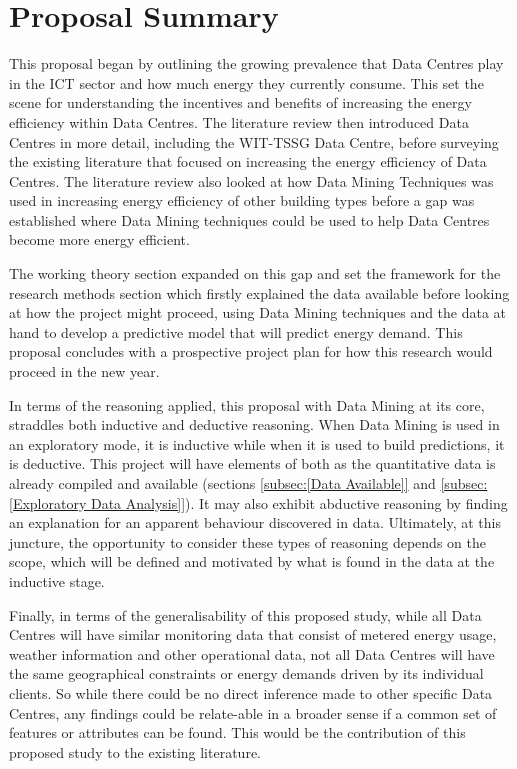 \documentclass[12pt]{scrartcl}
\begin{document}
\section{Proposal Summary}
\label{sec:[Proposal Summary]}
This proposal began by outlining the growing prevalence that Data Centres play in the ICT sector and how much energy they currently consume. This set the scene for understanding the incentives and benefits of increasing the energy efficiency within Data Centres. The literature review then introduced Data Centres in more detail, including the WIT-TSSG Data Centre, before surveying the existing literature that focused on increasing the energy efficiency of Data Centres.  The literature review also looked at how Data Mining Techniques was used in increasing energy efficiency of other building types before a gap was established where Data Mining techniques could be used to help Data Centres become more energy efficient. 

The working theory section expanded on this gap and set the framework for the research methods section which firstly explained the data available before looking at how the project might proceed, using Data Mining techniques and the data at hand to develop a predictive model that will predict energy demand. This proposal concludes with a prospective project plan for how this research would proceed in the new year.  

In terms of the reasoning applied, this proposal with Data Mining at its core, straddles both inductive and deductive reasoning. When Data Mining is used in an exploratory mode, it is inductive while when it is used to build predictions, it is deductive. This project will have elements of both as the quantitative data is already compiled and available (sections \ref{subsec:[Data Available]} and \ref{subsec:[Exploratory Data Analysis]}). It may also exhibit abductive reasoning by finding an explanation for an apparent behaviour discovered in data. Ultimately, at this juncture, the opportunity to consider these types of reasoning depends on the scope, which will be defined and motivated by what is found in the data at the inductive stage. 

Finally, in terms of the generalisability of this proposed study, while all Data Centres will have similar monitoring data that consist of metered energy usage, weather information and other operational data, not all Data Centres will have the same geographical constraints or energy demands driven by its individual clients. So while there could be no direct inference made to other specific Data Centres, any findings could be relate-able in a broader sense if a common set of features or attributes can be found. This would be the contribution of this proposed study to the existing literature.    
   
\end{document}
